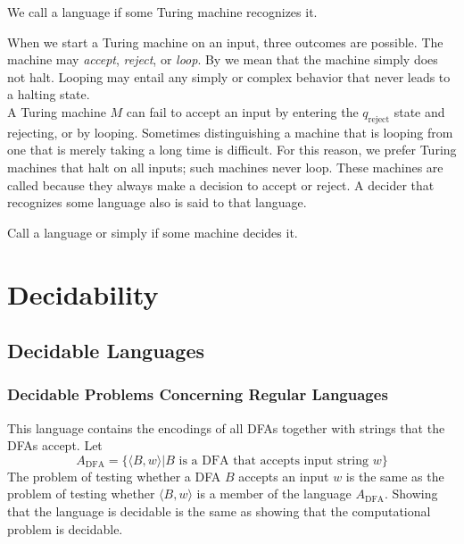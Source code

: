 \documentclass{article}
\begin{document}
\begin{definition}
  We call a language  if some Turing machine recognizes it. 
\end{definition}

When we start a Turing machine on an input, three outcomes are possible. The machine may \emph{accept}, \emph{reject}, or \emph{loop}. By  we mean that the machine simply does not halt. Looping may entail any simply or complex behavior that never leads to a halting state. \\ 

A Turing machine $M$ can fail to accept an input by entering the $q_{\textrm{reject}}$ state and rejecting, or by looping. Sometimes distinguishing a machine that is looping from one that is merely taking a long time is difficult. For this reason, we prefer Turing machines that halt on all inputs; such machines never loop. These machines are called  because they always make a decision to accept or reject. A decider that recognizes some language also is said to  that language. 

\begin{definition}
  Call a language  or simply  if some machine decides it.
\end{definition}

\section{Decidability}

\subsection{Decidable Languages}

\subsubsection{Decidable Problems Concerning Regular Languages}

This language contains the encodings of all DFAs together with strings that the DFAs accept. Let $$A_{\textrm{DFA}} = \{\langle B, w \rangle | B \textrm{ is a DFA that accepts input string } w\}$$ The problem of testing whether a DFA $B$ accepts an input $w$ is the same as the problem of testing whether $\langle B , w \rangle$ is a member of the language $A_{\textrm{DFA}}$. Showing that the language is decidable is the same as showing that the computational problem is decidable. 
\end{document}
